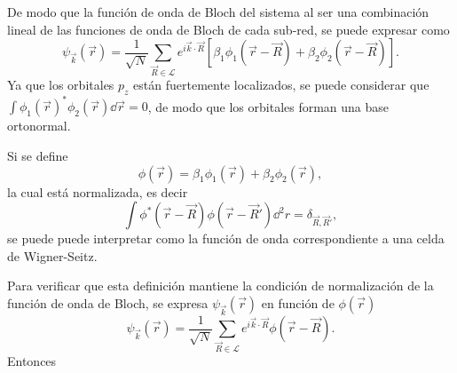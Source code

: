 De modo que la función de onda de Bloch del sistema al ser una combinación lineal de las funciones de onda de Bloch de cada sub-red, se puede expresar como
\begin{equation}
	\psi_{\vec{k}}(\vec{r}) = \frac{1}{\sqrt{N}}\sum_{\vec{R}\in \mathcal{L}} e^{i \vec{k}\cdot \vec{R}}\left[\beta_1\phi_1(\vec{r} - \vec{R}) + \beta_2\phi_2(\vec{r} - \vec{R})\right].\label{eq:wavegraphene}
\end{equation}
Ya que los orbitales $p_z$ están fuertemente localizados, se puede considerar que $\int \phi_1(\vec{r})^{\ast}\phi_2(\vec{r}) \dd \vec{r} = 0$, de modo que los orbitales forman una base ortonormal.\par 
Si se define
\begin{equation}
	\phi(\vec{r}) = \beta_1 \phi_1(\vec{r}) + \beta_2\phi_2(\vec{r}),\label{eq:waveindiv}
\end{equation}
la cual está normalizada, es decir 
\begin{equation}
	\int \phi^{\ast}(\vec{r}-\vec{R})\phi(\vec{r} - \vec{R}') \dd^2 r = \delta_{\vec{R},\vec{R}'},
\end{equation}
 se puede puede interpretar como la función de onda correspondiente a una celda de Wigner-Seitz.\par
Para verificar que esta definición mantiene la condición de normalización de la función de onda de Bloch, se expresa $\psi_{\vec{k}}(\vec{r})$ en función de $\phi(\vec{r})$
\begin{equation}
   \psi_{\vec{k}}(\vec{r}) = \frac{1}{\sqrt{N}} \sum_{\vec{R} \in \mathcal{L}} e^{i \vec{k}\cdot \vec{R}} \phi(\vec{r} - \vec{R}).
\end{equation}
Entonces

